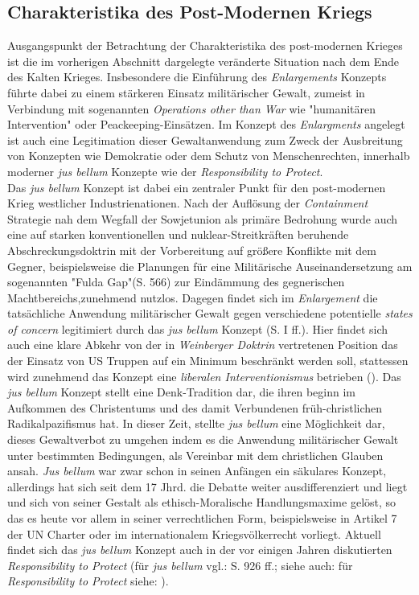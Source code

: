 \documentclass[11pt,a4paper,oneside,numbers=noenddot,bibliography=totocnumbered,DIV=13]{scrartcl}
\begin{document}
\subsection{Charakteristika des Post-Modernen Kriegs}
Ausgangspunkt der Betrachtung der Charakteristika des post-modernen Krieges ist die im vorherigen Abschnitt dargelegte veränderte Situation nach dem Ende des Kalten Krieges. Insbesondere die Einführung des \textit{Enlargements} Konzepts führte dabei zu einem stärkeren Einsatz militärischer Gewalt, zumeist in Verbindung mit sogenannten \textit{Operations other than War} wie "humanitären Intervention" oder Peackeeping-Einsätzen. Im Konzept des \textit{Enlargments} angelegt ist auch eine Legitimation dieser Gewaltanwendung zum Zweck der Ausbreitung von Konzepten wie Demokratie oder dem Schutz von Menschenrechten, innerhalb moderner \textit{jus bellum} Konzepte wie der \textit{Responsibility to Protect}.\\
Das \textit{jus bellum} Konzept ist dabei ein zentraler Punkt für den post-modernen Krieg westlicher Industrienationen. Nach der Auflösung der \textit{Containment} Strategie nah dem Wegfall der Sowjetunion als primäre Bedrohung wurde auch eine auf starken konventionellen und nuklear-Streitkräften beruhende Abschreckungsdoktrin mit der Vorbereitung auf größere Konflikte mit dem Gegner, beispielsweise die Planungen für eine Militärische Auseinandersetzung am sogenannten "Fulda Gap"(\cite{olson_war_2007}S. 566) zur Eindämmung des gegnerischen Machtbereichs,zunehmend nutzlos. Dagegen findet sich im \textit{Enlargement} die tatsächliche Anwendung militärischer Gewalt gegen verschiedene potentielle \textit{states of concern} legitimiert durch das \textit{jus bellum} Konzept (\cite{DerDerian2001}S. I ff.). Hier findet sich auch eine klare Abkehr von der in \textit{Weinberger Doktrin} vertretenen Position das der Einsatz von US Truppen auf ein Minimum beschränkt werden soll, stattessen wird zunehmend das Konzept eine \textit{liberalen Interventionismus} betrieben (\cite{lafeber_rise_2009}).  
Das \textit{jus bellum} Konzept stellt eine Denk-Tradition dar, die ihren beginn im Aufkommen des Christentums und des damit Verbundenen früh-christlichen Radikalpazifismus hat. In dieser Zeit, stellte \textit{jus bellum} eine Möglichkeit dar, dieses Gewaltverbot zu umgehen indem es die Anwendung militärischer Gewalt unter bestimmten Bedingungen, als Vereinbar mit dem christlichen Glauben ansah. \textit{Jus bellum} war zwar schon in seinen Anfängen ein säkulares Konzept, allerdings hat sich seit dem 17 Jhrd. die Debatte weiter ausdifferenziert und liegt und sich von seiner Gestalt als ethisch-Moralische Handlungsmaxime gelöst, so das es heute vor allem in seiner verrechtlichen Form, beispielsweise in Artikel 7 der UN Charter oder im internationalem Kriegsvölkerrecht vorliegt. Aktuell findet sich das \textit{jus bellum} Konzept auch in der vor einigen Jahren diskutierten \textit{Responsibility to Protect} (für \textit{jus bellum} vgl.: \cite{2002} S. 926 ff.; siehe auch: \cite{bellamy_responsibilities_2008} für \textit{Responsibility to Protect} siehe: \cite{international_commission_on_intervention_and_state_sovereignty_responsibility_2001}).\\
\end{document}
